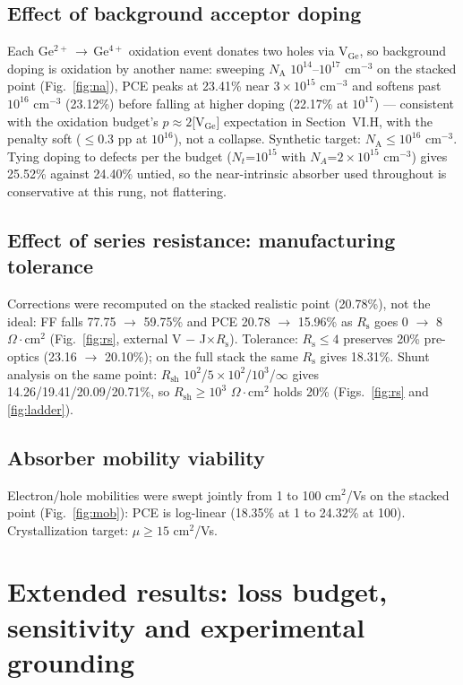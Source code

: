 \documentclass[aip,amsmath,amssymb,preprint]{revtex4-2}
\begin{document}
\subsection{Effect of background acceptor doping}
Each Ge$^{2+}$\,$\rightarrow$\,Ge$^{4+}$ oxidation event donates two holes via V$_{\mathrm{Ge}}$, so background doping is oxidation by another name: sweeping $N_{\mathrm{A}}$ $10^{14}$--$10^{17}$ cm$^{-3}$ on the stacked point (Fig.~\ref{fig:na}), PCE peaks at 23.41\% near $3\times10^{15}$ cm$^{-3}$ and softens past $10^{16}$ cm$^{-3}$ (23.12\%) before falling at higher doping (22.17\% at $10^{17}$) --- consistent with the oxidation budget's $p\approx2$[V$_{\mathrm{Ge}}$] expectation in Section~VI.H, with the penalty soft ($\le$0.3 pp at $10^{16}$), not a collapse. Synthetic target: $N_{\mathrm{A}}\le10^{16}$ cm$^{-3}$. Tying doping to defects per the budget ($N_{t}$=$10^{15}$ with $N_{A}$=$2\times10^{15}$ cm$^{-3}$) gives 25.52\% against 24.40\% untied, so the near-intrinsic absorber used throughout is conservative at this rung, not flattering.
\subsection{Effect of series resistance: manufacturing tolerance}
Corrections were recomputed on the stacked realistic point (20.78\%), not the ideal: FF falls 77.75 $\rightarrow$ 59.75\% and PCE 20.78 $\rightarrow$ 15.96\% as $R_{\mathrm{s}}$ goes 0 $\rightarrow$ 8 $\Omega\cdot$cm$^{2}$ (Fig.~\ref{fig:rs}, external V $-$ J$\times$$R_{\mathrm{s}}$). Tolerance: $R_{\mathrm{s}}\le4$ preserves 20\% pre-optics (23.16 $\rightarrow$ 20.10\%); on the full stack the same $R_{\mathrm{s}}$ gives 18.31\%. Shunt analysis on the same point: $R_{\mathrm{sh}}$ $10^{2}$/$5\times10^{2}$/$10^{3}$/$\infty$ gives 14.26/19.41/20.09/20.71\%, so $R_{\mathrm{sh}}\ge10^{3}$ $\Omega\cdot$cm$^{2}$ holds 20\% (Figs.~\ref{fig:rs} and \ref{fig:ladder}).
\subsection{Absorber mobility viability}
Electron/hole mobilities were swept jointly from 1 to 100 cm$^{2}$/Vs on the stacked point (Fig.~\ref{fig:mob}): PCE is log-linear (18.35\% at 1 to 24.32\% at 100). Crystallization target: $\mu\ge15$ cm$^{2}$/Vs.


\section{Extended results: loss budget, sensitivity and experimental grounding}
\end{document}
